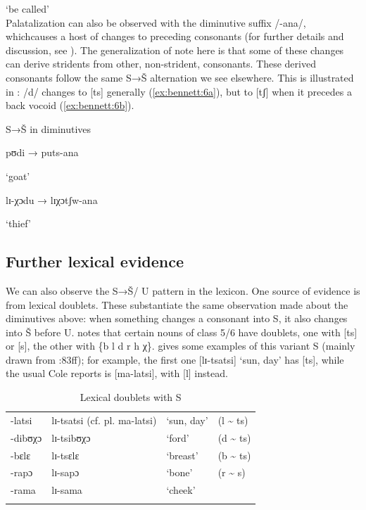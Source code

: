 \documentclass[output=paper,newtxmath,modfonts,nonflat,hidelinks]{langsci/langscibook}
\begin{document}
     ‘be called’\\
\z
\z
Palatalization can also be observed with the diminutive suffix /-ana/, which\linebreak causes a host of changes to preceding consonants (for further details and discussion, see \citealt{Cole1955,Louw1975,Herbert1990,Bateman:2007aa,Kotze&Zerbian2008}). The generalization of note here is that some of these changes can derive stridents from other, non-strident, consonants. These derived consonants follow the same S→Š alternation we see elsewhere. This is illustrated in : /d/ changes to [ts] generally (\ref{ex:bennett:6a}), but to [tʃ] when it precedes a back vocoid (\ref{ex:bennett:6b}). 

\ea\label{ex:bennett:6}
S→Š in diminutives \citep{Cole1955}\\
\ea\label{ex:bennett:6a}

pʊdi  → puts-ana

     ‘goat’\\
\ex\label{ex:bennett:6b}

lɪ-χɔdu  → lɪχɔtʃw-ana

     ‘thief’\\
\z
\z

\subsection{Further lexical evidence}\label{sec:bennett:2.5}


We can also observe the S→Š/ {\longrule} U pattern in the lexicon. One source of evidence is from lexical doublets. These substantiate the same observation made about the diminutives above: when something changes a consonant into S, it also changes into Š before U. \citet[83ff]{Cole1955} notes that certain nouns of class 5/6 have doublets, one with [ts] or [s], the other with \{b l d r h χ\}.  gives some examples of this variant S (mainly drawn from \citealt{Cole1955}:83ff); for example, the first one [lɪ-tsatsi] ‘sun, day’ has [ts], while the usual  Cole reports is [ma-latsi], with [l] instead.
%
\begin{table}[t]
\begin{tabularx}{\textwidth}{llXX}
\lsptoprule

-latsi & lɪ-tsatsi (cf. pl. ma-latsi) & ‘sun, day’ & (l {\textasciitilde} ts)\\
-dibʊχɔ & lɪ-tsibʊχɔ & ‘ford’ & (d {\textasciitilde} ts)\\
-bɛlɛ & lɪ-tsɛlɛ & ‘breast’ & (b {\textasciitilde} ts)\\
-rapɔ & lɪ-sapɔ & ‘bone’ & (r {\textasciitilde} s) \\
-rama & lɪ-sama & ‘cheek’ & \\
\lspbottomrule
\end{tabularx}
\caption{Lexical doublets with S}
\label{tab:bennett:4}
\end{table}
\end{document}
